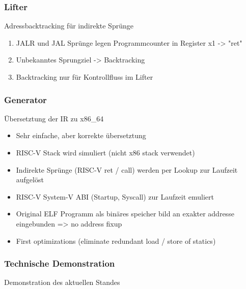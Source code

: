 
\begin{frame}
    \frametitle{Lifter}{Adressbacktracking für indirekte Sprünge}

    \begin{enumerate}
        \setlength\itemsep{0.5em}
        \item JALR und JAL Sprünge legen Programmcounter in Register x1 -> "ret"
        \item Unbekanntes Sprungziel -> Backtracking
        \item Backtracking nur für Kontrollfluss im Lifter
    \end{enumerate}
\end{frame}
\clearpage

\note[itemize]{

}


\begin{frame}
    \frametitle{Generator}{Übersetztung der IR zu x86\_64}

    \begin{itemize}
        \item Sehr einfache, aber korrekte übersetztung
        \item RISC-V Stack wird simuliert (nicht x86 stack verwendet)
        \item Indirekte Sprünge (RISC-V ret / call) werden per Lookup zur Laufzeit aufgelöst
        \item RISC-V System-V ABI (Startup, Syscall) zur Laufzeit emuliert
        \item Original ELF Programm als binäres speicher bild an exakter addresse eingebunden => no address fixup
        \item First optimizations (eliminate redundant load / store of statics)
    \end{itemize}
\end{frame}
\clearpage


\begin{frame}
    \frametitle{Technische Demonstration}{Demonstration des aktuellen Standes}

\end{frame}
\clearpage

